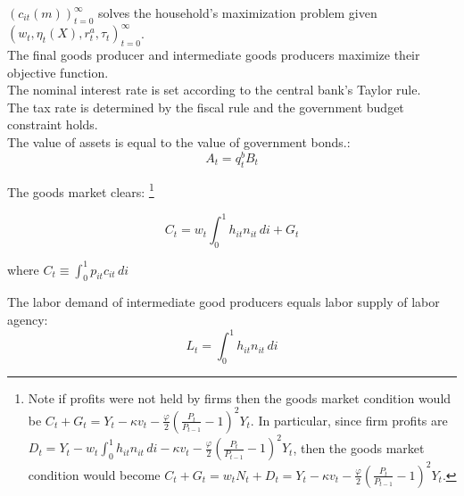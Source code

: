 $ \left(  c_{it}(m)\right)_{t=0}^{\infty}$  solves the household's maximization problem given $  \left( w_{t}, \eta_{t}(X),  r^{a}_{t} , \tau_{t} \right)_{t=0}^{\infty}$.\\

The final goods producer and intermediate goods producers maximize their objective function. \\

The nominal interest rate is set according to the central bank's Taylor rule. \\

The tax rate is determined by the fiscal rule and the government budget constraint holds. \\

The value of assets is equal to the value of government bonds.:
 $$ A_t =  q^{b}_{t}B_{t}  $$




 The goods market clears: \footnote{Note if profits were not held by firms then the goods market condition would be $ C_{t}  + G_{t}  = Y_{t} -  \kappa v_{t} - \frac{\varphi}{2}\left( \frac{P_{t}}{P_{t-1}} - 1\right)^{2} Y_{t}  $.  In particular, since firm profits are $D_{t} = Y_{t} -  w_{t} \int_{0}^{1} h_{it}n_{it} \, di  - \kappa v_{t} - \frac{\varphi}{2}\left( \frac{P_{t}}{P_{t-1}} - 1\right)^{2} Y_{t} $, then the goods market condition would become $ C_{t}  + G_{t}  =w_{t} N_{t}  + D_{t} = Y_{t} -  \kappa v_{t} - \frac{\varphi}{2}\left( \frac{P_{t}}{P_{t-1}} - 1\right)^{2} Y_{t}  $. }
 
$$ C_{t}  = w_{t} \int_{0}^{1} h_{it}n_{it} \, di  + G_{t} $$

 where $C_{t} \equiv  \int_{0}^{1} p_{it} c_{it}\, di $ 

The labor demand of intermediate good producers equals labor supply of labor agency:
$$ L_{t} =  \int_{0}^{1} h_{it}n_{it} \, di$$  

